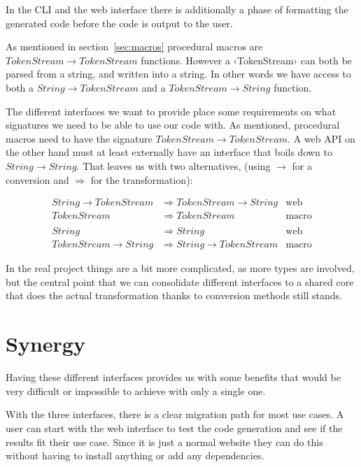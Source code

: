 In the CLI and the web interface there is additionally a phase of formatting the generated code before the code is output to the user.

As mentioned in section~\ref{sec:macros} procedural macros are $ TokenStream \rightarrow TokenStream $ functions. However a ‹TokenStream› can both be parsed from a string, and written into a string. In other words we have access to both a $ String \rightarrow TokenStream $ and a $ TokenStream \rightarrow String $ function.

The different interfaces we want to provide place some requirements on what signatures we need to be able to use our code with. As mentioned, procedural macros need to have the signature $ TokenStream \rightarrow TokenStream $. A web API on the other hand must at least externally have an interface that boils down to $ String \rightarrow String $. That leaves us with two alternatives, (using $\rightarrow$ for a conversion and $\Rightarrow$ for the transformation):

\begin{align*}
String \rightarrow TokenStream &\Rightarrow TokenStream \rightarrow String & \text{web} \\
                   TokenStream &\Rightarrow TokenStream                    & \text{macro} \\
\\
                        String &\Rightarrow String                         & \text{web} \\
TokenStream \rightarrow String &\Rightarrow String \rightarrow TokenStream & \text{macro}
\end{align*}

In the real project things are a bit more complicated, as more types are involved, but the central point that we can consolidate different interfaces to a shared core that does the actual transformation thanks to conversion methods still stands.

\section{Synergy}

Having these different interfaces provides us with some benefits that would be very difficult or impossible to achieve with only a single one.

With the three interfaces, there is a clear migration path for most use cases. A user can start with the web interface to test the code generation and see if the results fit their use case. Since it is just a normal website they can do this without having to install anything or add any dependencies.

